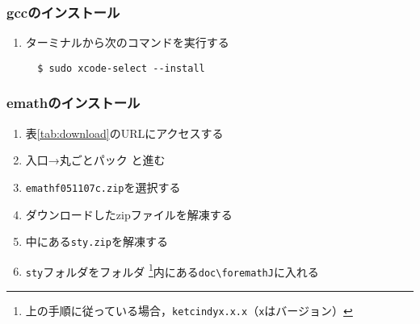 \subsubsection{gccのインストール}
\begin{enumerate}
    \item ターミナルから次のコマンドを実行する
          \begin{lstlisting}
  $ sudo xcode-select --install
          \end{lstlisting}
\end{enumerate}

\subsubsection{emathのインストール}
\begin{enumerate}
    \item 表\ref{tab:download}のURLにアクセスする
    \item 入口→丸ごとパック と進む
    \item \verb|emathf051107c.zip|を選択する
    \item ダウンロードしたzipファイルを解凍する
    \item 中にある\verb|sty.zip|を解凍する
    \item \verb|sty|フォルダを{\ketcindy}フォルダ
    \cprotect\footnote{上の手順に従っている場合，\verb|ketcindyx.x.x|（\verb|x|はバージョン）}内にある\verb|doc\foremathJ|に入れる
\end{enumerate}
